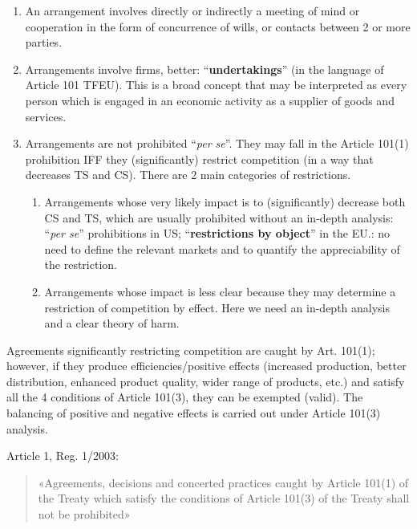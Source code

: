     \begin{enumerate}
        \item An arrangement involves directly or indirectly a meeting of mind or cooperation in the form of concurrence of wills, or contacts between 2 or more parties.
        \item Arrangements involve firms, better: “\textbf{undertakings}” (in the language of Article 101 TFEU). This is a broad concept that may be interpreted as every person which is engaged in an economic activity as a supplier of goods and services.
        \item Arrangements are not prohibited “\textit{per se}”. They may fall in the Article 101(1) prohibition IFF they (significantly) restrict competition (in a way that decreases TS and CS). There are 2 main categories of restrictions.
            \begin{enumerate}
                \item Arrangements whose very likely impact is to (significantly) decrease both CS and TS, which are usually prohibited without an in-depth analysis: “\textit{per se}” prohibitions in US; “\textbf{restrictions by object}” in the EU.: no need to define the relevant markets and to quantify the appreciability of the restriction.
                \item Arrangements whose impact is less clear because they may determine a restriction of competition by effect. Here we need an in-depth analysis and a clear theory of harm.
            \end{enumerate}
    \end{enumerate}

    Agreements significantly restricting competition are caught by Art. 101(1); however, if they produce efficiencies/positive effects (increased production, better distribution, enhanced product quality, wider range of products, etc.) and satisfy all the 4 conditions of Article 101(3), they can be exempted (valid). The balancing of positive and negative effects is carried out under Article 101(3) analysis. 
    
    Article 1, Reg. 1/2003: 

    \begin{quote}
        «Agreements, decisions and concerted practices caught by Article 101(1) of the Treaty which satisfy the conditions of Article 101(3) of the Treaty shall not be prohibited»
    \end{quote}

